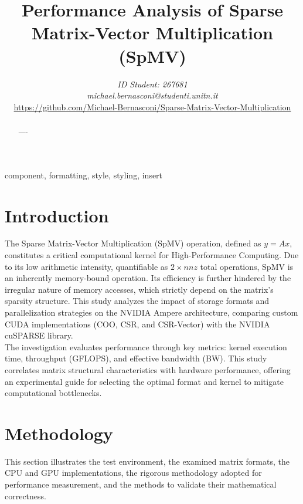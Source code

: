 \documentclass[conference]{IEEEtran}
\begin{document}
\title{Performance Analysis of Sparse Matrix-Vector Multiplication (SpMV)}

\author{
\textit{ID Student: 267681}\\
\textit{michael.bernasconi@studenti.unitn.it} \\
\url{https://github.com/Michael-Bernasconi/Sparse-Matrix-Vector-Multiplication}
}

\maketitle

\begin{abstract}
----
\end{abstract}

\begin{IEEEkeywords}
component, formatting, style, styling, insert
\end{IEEEkeywords}\section{Introduction}
The Sparse Matrix-Vector Multiplication (SpMV) operation, defined as $y = Ax$, constitutes a critical computational kernel for High-Performance Computing.
Due to its low arithmetic intensity, quantifiable as $2 \times nnz$ total operations, SpMV is an inherently memory-bound operation.
Its efficiency is further hindered by the irregular nature of memory accesses, which strictly depend on the matrix's sparsity structure.
This study analyzes the impact of storage formats and parallelization strategies on the NVIDIA Ampere architecture, comparing custom CUDA implementations (COO, CSR, and CSR-Vector) with the NVIDIA cuSPARSE library.\\
The investigation evaluates performance through key metrics: kernel execution time, throughput (GFLOPS), and effective bandwidth (BW).
This study correlates matrix structural characteristics with hardware performance, offering an experimental guide for selecting the optimal format and kernel to mitigate computational bottlenecks.

\section{Methodology}
This section illustrates the test environment, the examined matrix formats, the CPU and GPU implementations, the rigorous methodology adopted for performance measurement, and the methods to validate their mathematical correctness.
\end{document}
